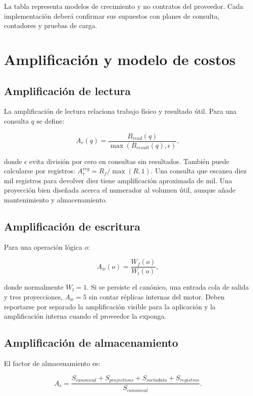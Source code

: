 La tabla representa modelos de crecimiento y no contratos del proveedor. Cada
implementación deberá confirmar sus supuestos con planes de consulta, contadores y
pruebas de carga.

\chapter{Amplificación y modelo de costos}

\section{Amplificación de lectura}

La amplificación de lectura relaciona trabajo físico y resultado útil. Para una consulta
$q$ se define:

\begin{equation}
A_r(q)=\frac{B_{read}(q)}{\max(B_{result}(q),\epsilon)},
\end{equation}

donde $\epsilon$ evita división por cero en consultas sin resultados. También puede
calcularse por registros: $A_r^{reg}=R_f/\max(R,1)$. Una consulta que escanea diez mil
registros para devolver diez tiene amplificación aproximada de mil. Una proyección bien
diseñada acerca el numerador al volumen útil, aunque añade mantenimiento y almacenamiento.

\section{Amplificación de escritura}

Para una operación lógica $o$:

\begin{equation}
A_w(o)=\frac{W_f(o)}{W_l(o)},
\end{equation}

donde normalmente $W_l=1$. Si se persiste el canónico, una entrada cola de salida y tres
proyecciones, $A_w=5$ sin contar réplicas internas del motor. Deben reportarse por
separado la amplificación visible para la aplicación y la amplificación interna cuando
el proveedor la exponga.

\section{Amplificación de almacenamiento}

El factor de almacenamiento es:

\begin{equation}
A_s=\frac{S_{canonical}+S_{projections}+S_{metadata}+S_{registros}}
{S_{canonical}}.
\end{equation}

